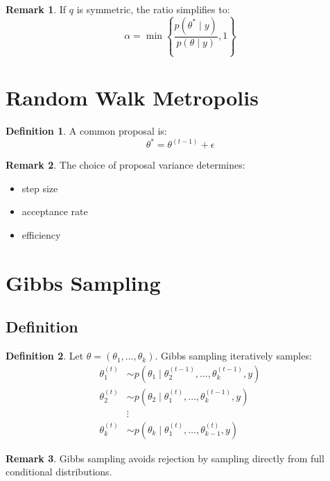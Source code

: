 \documentclass[12pt,oneside]{book}
\numberwithin{equation}{section}
\theoremstyle{definition}
\newtheorem{definition}{Definition}[section]
\newtheorem{remark}{Remark}[section]
\theoremstyle{plain}
\theoremstyle{remark}
\begin{document}
\begin{remark}
If $q$ is symmetric, the ratio simplifies to:
$$
\alpha = \min\left\{\frac{p(\theta^* \mid y)}{p(\theta \mid y)}, 1\right\}
$$
\end{remark}

\section{Random Walk Metropolis}

\begin{definition}
A common proposal is:
$$
\theta^* = \theta^{(t-1)} + \epsilon
$$
\end{definition}

\begin{remark}
The choice of proposal variance determines:
\begin{itemize}
\item step size
\item acceptance rate
\item efficiency
\end{itemize}
\end{remark}

\section{Gibbs Sampling}

\subsection{Definition}

\begin{definition}
Let $\theta = (\theta_1, \dots, \theta_k)$. Gibbs sampling iteratively samples:
\begin{align*}
\theta_1^{(t)} &\sim p(\theta_1 \mid \theta_2^{(t-1)}, \dots, \theta_k^{(t-1)}, y) \\
\theta_2^{(t)} &\sim p(\theta_2 \mid \theta_1^{(t)}, \dots, \theta_k^{(t-1)}, y) \\
&\vdots \\
\theta_k^{(t)} &\sim p(\theta_k \mid \theta_1^{(t)}, \dots, \theta_{k-1}^{(t)}, y)
\end{align*}
\end{definition}

\begin{remark}
Gibbs sampling avoids rejection by sampling directly from full conditional distributions.
\end{remark}
\end{document}
